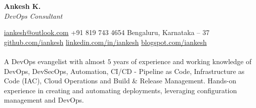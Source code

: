 \documentclass[12pt, a4paper]{article}
\begin{document}
\begin{flushleft}
      \Large\textbf{Ankesh K.}\\
      \large\textit{DevOps Consultant}
\end{flushleft}
\vspace{-3mm}
\faEnvelope \href{mailto:iankesh@outlook.com}{iankesh@outlook.com}  {}  {}  {}  \faPhone +91 819 743 4654  {}  {}  {}  \faHome Bengaluru, Karnataka – 37 \\
\footnotesize \faGithub \url{github.com/iankesh} {}  {}  {} \faLinkedin \url{linkedin.com/in/iankesh} {}  {}  {} \faEdit \url{blogspot.com/iankesh} \\
\vspace{-2mm} \\
A DevOps evangelist with almost $5$ years of experience and working knowledge of DevOps, DevSecOps, Automation, CI/CD - Pipeline as Code,  Infrastructure as Code (IAC), Cloud Operations and Build \& Release Management. Hands-on experience in creating and automating deployments, leveraging configuration management and DevOps.  \\
\end{document}
